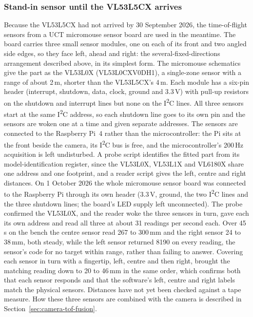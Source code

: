 \subsubsection*{Stand-in sensor until the VL53L5CX arrives}

Because the VL53L5CX had not arrived by 30 September 2026, the time-of-flight sensors from a UCT micromouse sensor board are used in the meantime. The board carries three small sensor modules, one on each of its front and two angled side edges, so they face left, ahead and right: the several-fixed-directions arrangement described above, in its simplest form. The micromouse schematics give the part as the VL53L0X (VL53L0CXV0DH1), a single-zone sensor with a range of about 2\,m, shorter than the VL53L5CX's 4\,m. Each module has a six-pin header (interrupt, shutdown, data, clock, ground and 3.3\,V) with pull-up resistors on the shutdown and interrupt lines but none on the I\textsuperscript{2}C lines. All three sensors start at the same I\textsuperscript{2}C address, so each shutdown line goes to its own pin and the sensors are woken one at a time and given separate addresses. The sensors are connected to the Raspberry Pi~4 rather than the microcontroller: the Pi sits at the front beside the camera, its I\textsuperscript{2}C bus is free, and the microcontroller's 200\,Hz acquisition is left undisturbed. A probe script identifies the fitted part from its model-identification register, since the VL53L0X, VL53L1X and VL6180X share one address and one footprint, and a reader script gives the left, centre and right distances. On 1 October 2026 the whole micromouse sensor board was connected to the Raspberry Pi through its own header (3.3\,V, ground, the two I\textsuperscript{2}C lines and the three shutdown lines; the board's LED supply left unconnected). The probe confirmed the VL53L0X, and the reader woke the three sensors in turn, gave each its own address and read all three at about 31 readings per second each. Over 45\,s on the bench the centre sensor read 267 to 300\,mm and the right sensor 24 to 38\,mm, both steady, while the left sensor returned 8190 on every reading, the sensor's code for no target within range, rather than failing to answer. Covering each sensor in turn with a fingertip, left, centre and then right, brought the matching reading down to 20 to 46\,mm in the same order, which confirms both that each sensor responds and that the software's left, centre and right labels match the physical sensors. Distances have not yet been checked against a tape measure. How these three sensors are combined with the camera is described in Section~\ref{sec:camera-tof-fusion}.

